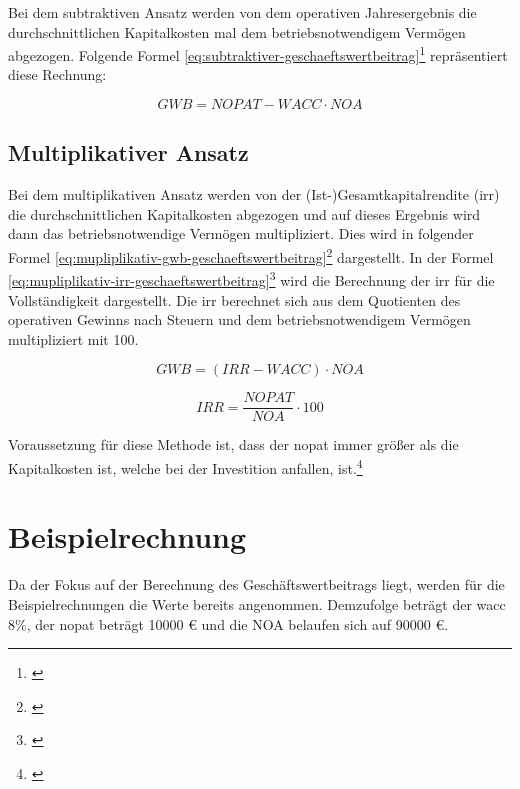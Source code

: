 Bei dem subtraktiven Ansatz werden von dem operativen Jahresergebnis die durchschnittlichen Kapitalkosten mal dem betriebsnotwendigem Vermögen abgezogen. Folgende Formel \eqref{eq:subtraktiver-geschaeftswertbeitrag}\footnote{\cite{wikipedia-eva}} repräsentiert diese Rechnung:

\begin{equation}
    GWB = NOPAT - WACC \cdot NOA
    \label{eq:subtraktiver-geschaeftswertbeitrag}
\end{equation}

\subsection{Multiplikativer Ansatz}

Bei dem multiplikativen Ansatz werden von der (Ist-)Gesamtkapitalrendite (\ac{irr}) die durchschnittlichen Kapitalkosten abgezogen und auf dieses Ergebnis wird dann das betriebsnotwendige Vermögen multipliziert. Dies wird in folgender Formel \eqref{eq:mupliplikativ-gwb-geschaeftswertbeitrag}\footnote{\cite{wikipedia-eva}} dargestellt. In der Formel \eqref{eq:mupliplikativ-irr-geschaeftswertbeitrag}\footnote{\cite{controllingportal-eva}} wird die Berechnung der \ac{irr} für die Vollständigkeit dargestellt. Die \ac{irr} berechnet sich aus dem Quotienten des operativen Gewinns nach Steuern und dem betriebsnotwendigem Vermögen multipliziert mit 100.

\begin{equation}
    GWB = (IRR - WACC) \cdot NOA
    \label{eq:mupliplikativ-gwb-geschaeftswertbeitrag}
\end{equation}

\begin{equation}
    IRR = \frac{NOPAT}{NOA} \cdot 100
    \label{eq:mupliplikativ-irr-geschaeftswertbeitrag}
\end{equation}

\bigskip

\noindent
Voraussetzung für diese Methode ist, dass der \ac{nopat} immer größer als die Kapitalkosten ist, welche bei der Investition anfallen, ist.\footnote{\cite{bwllexicon-eva}}

\section{Beispielrechnung}

Da der Fokus auf der Berechnung des Geschäftswertbeitrags liegt, werden für die Beispielrechnungen die Werte bereits angenommen. Demzufolge beträgt der \ac{wacc} 8\%, der \ac{nopat} beträgt 10000 € und die NOA belaufen sich auf 90000 €.


